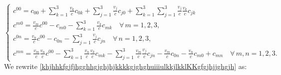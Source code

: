 \documentclass{article}
\theoremstyle{definition}
\theoremstyle{remark}
\newcommand{\er}{\eqref}
\newcommand{\er}{\eqref}
\begin{document}
\begin{equation}\label{khjhhkfgjfjhgghhgjghjhjkkkkgjghghuiiiulkkjlkklKKgfgjhjjghgjh}
\begin{cases}
c^{00}=c_{00}+\sum_{k=1}^{3}\frac{v_k}{c}c_{0k}+\sum_{j=1}^{3}\frac{v_j}{c}c_{j0}+\sum_{k=1}^{3}\sum_{j=1}^{3}\frac{v_j}{c}\frac{v_k}{c}c_{jk}
\\
c^{m0}=
\frac{v_m}{c}c^{00}-c_{m0}-\sum_{k=1}^{3}\frac{v_k}{c}c_{mk}
\quad\forall\, m=1,2,3,
\\
c^{0n}=\frac{v_n}{c}c^{00}
-c_{0n}
-\sum_{j=1}^{3}\frac{v_j}{c}c_{jn} \quad\forall\, n=1,2,3,
\\
c^{mn}=\frac{v_m}{c}\frac{v_n}{c}c^{00}
-\sum_{k=1}^{3}\frac{v_n}{c}\frac{v_k}{c}c_{mk}-\sum_{j=1}^{3}\frac{v_m}{c}\frac{v_j}{c}c_{jn}
-\frac{v_m}{c}c_{0n}-\frac{v_n}{c}c_{m0}+c_{mn}\quad\forall\,
m,n=1,2,3.
\end{cases}
\end{equation}
We rewrite
\er{khjhhkfgjfjhgghhgjghjhjkkkkgjghghuiiiulkkjlkklKKgfgjhjjghgjh}
as:
\end{document}
